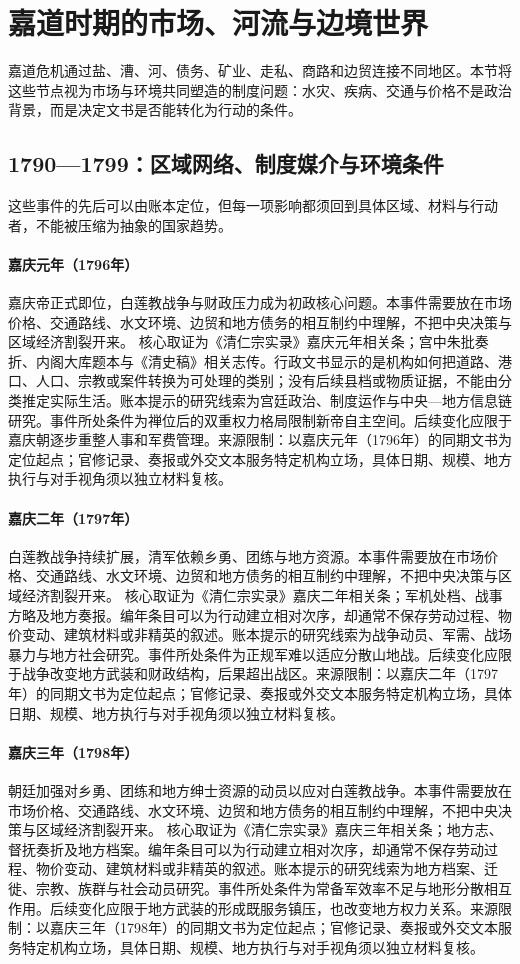 \section{嘉道时期的市场、河流与边境世界}
嘉道危机通过盐、漕、河、债务、矿业、走私、商路和边贸连接不同地区。本节将这些节点视为市场与环境共同塑造的制度问题：水灾、疾病、交通与价格不是政治背景，而是决定文书是否能转化为行动的条件。
\subsection{1790—1799：区域网络、制度媒介与环境条件}
这些事件的先后可以由账本定位，但每一项影响都须回到具体区域、材料与行动者，不能被压缩为抽象的国家趋势。
\hypertarget{civic:EQ-1796-JIAQING-ACCESSION}{}\paragraph{嘉庆元年（1796年）}嘉庆帝正式即位，白莲教战争与财政压力成为初政核心问题。本事件需要放在市场价格、交通路线、水文环境、边贸和地方债务的相互制约中理解，不把中央决策与区域经济割裂开来。 核心取证为《清仁宗实录》嘉庆元年相关条；宫中朱批奏折、内阁大库题本与《清史稿》相关志传。行政文书显示的是机构如何把道路、港口、人口、宗教或案件转换为可处理的类别；没有后续县档或物质证据，不能由分类推定实际生活。账本提示的研究线索为宫廷政治、制度运作与中央—地方信息链研究。事件所处条件为禅位后的双重权力格局限制新帝自主空间。后续变化应限于嘉庆朝逐步重整人事和军费管理。来源限制：以嘉庆元年（1796年）的同期文书为定位起点；官修记录、奏报或外交文本服务特定机构立场，具体日期、规模、地方执行与对手视角须以独立材料复核。
\hypertarget{civic:EQ-1797-WHITE-LOTUS-WAR}{}\paragraph{嘉庆二年（1797年）}白莲教战争持续扩展，清军依赖乡勇、团练与地方资源。本事件需要放在市场价格、交通路线、水文环境、边贸和地方债务的相互制约中理解，不把中央决策与区域经济割裂开来。 核心取证为《清仁宗实录》嘉庆二年相关条；军机处档、战事方略及地方奏报。编年条目可以为行动建立相对次序，却通常不保存劳动过程、物价变动、建筑材料或非精英的叙述。账本提示的研究线索为战争动员、军需、战场暴力与地方社会研究。事件所处条件为正规军难以适应分散山地战。后续变化应限于战争改变地方武装和财政结构，后果超出战区。来源限制：以嘉庆二年（1797年）的同期文书为定位起点；官修记录、奏报或外交文本服务特定机构立场，具体日期、规模、地方执行与对手视角须以独立材料复核。
\hypertarget{civic:EQ-1798-MILITIA-MOBILIZATION}{}\paragraph{嘉庆三年（1798年）}朝廷加强对乡勇、团练和地方绅士资源的动员以应对白莲教战争。本事件需要放在市场价格、交通路线、水文环境、边贸和地方债务的相互制约中理解，不把中央决策与区域经济割裂开来。 核心取证为《清仁宗实录》嘉庆三年相关条；地方志、督抚奏折及地方档案。编年条目可以为行动建立相对次序，却通常不保存劳动过程、物价变动、建筑材料或非精英的叙述。账本提示的研究线索为地方档案、迁徙、宗教、族群与社会动员研究。事件所处条件为常备军效率不足与地形分散相互作用。后续变化应限于地方武装的形成既服务镇压，也改变地方权力关系。来源限制：以嘉庆三年（1798年）的同期文书为定位起点；官修记录、奏报或外交文本服务特定机构立场，具体日期、规模、地方执行与对手视角须以独立材料复核。
